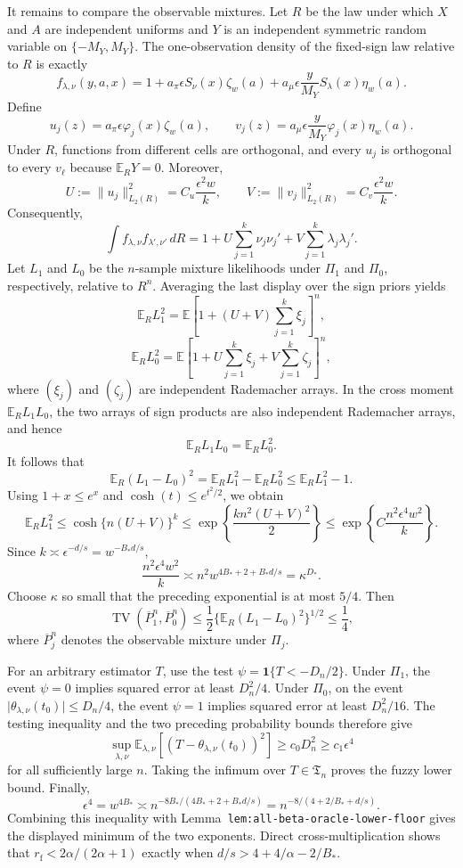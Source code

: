 It remains to compare the observable mixtures. Let \(R\) be the law under which \(X\) and \(A\) are independent uniforms and \(Y\) is an independent symmetric random variable on \(\{-M_Y,M_Y\}\). The one-observation density of the fixed-sign law relative to \(R\) is exactly
\[
f_{\lambda,\nu}(y,a,x)
=
1+a_\pi\epsilon S_\nu(x)\zeta_w(a)
+a_\mu\epsilon\frac{y}{M_Y}S_\lambda(x)\eta_w(a).
\]
Define
\[
u_j(z)=a_\pi\epsilon\varphi_j(x)\zeta_w(a),
\qquad
v_j(z)=a_\mu\epsilon\frac{y}{M_Y}\varphi_j(x)\eta_w(a).
\]
Under \(R\), functions from different cells are orthogonal, and every \(u_j\) is orthogonal to every \(v_\ell\) because \(\mathbb E_RY=0\). Moreover,
\[
U:=\lVert u_j\rVert_{L_2(R)}^2=C_u\frac{\epsilon^2w}{k},
\qquad
V:=\lVert v_j\rVert_{L_2(R)}^2=C_v\frac{\epsilon^2w}{k}.
\]
Consequently,
\[
\int f_{\lambda,\nu}f_{\lambda',\nu'}\,dR
=
1+U\sum_{j=1}^k\nu_j\nu_j'
+V\sum_{j=1}^k\lambda_j\lambda_j'.
\]
Let \(L_1\) and \(L_0\) be the \(n\)-sample mixture likelihoods under \(\Pi_1\) and \(\Pi_0\), respectively, relative to \(R^n\). Averaging the last display over the sign priors yields
\[
\mathbb E_RL_1^2
=
\mathbb E\left[1+(U+V)\sum_{j=1}^k\xi_j\right]^n,
\]
\[
\mathbb E_RL_0^2
=
\mathbb E\left[1+U\sum_{j=1}^k\xi_j+V\sum_{j=1}^k\zeta_j\right]^n,
\]
where \((\xi_j)\) and \((\zeta_j)\) are independent Rademacher arrays. In the cross moment \(\mathbb E_RL_1L_0\), the two arrays of sign products are also independent Rademacher arrays, and hence
\[
\mathbb E_RL_1L_0=\mathbb E_RL_0^2.
\]
It follows that
\[
\mathbb E_R(L_1-L_0)^2
=
\mathbb E_RL_1^2-\mathbb E_RL_0^2
\le
\mathbb E_RL_1^2-1.
\]
Using \(1+x\le e^x\) and \(\cosh(t)\le e^{t^2/2}\), we obtain
\[
\mathbb E_RL_1^2
\le
\cosh\{n(U+V)\}^k
\le
\exp\left\{\frac{k n^2(U+V)^2}{2}\right\}
\le
\exp\left\{C\frac{n^2\epsilon^4w^2}{k}\right\}.
\]
Since \(k\asymp\epsilon^{-d/s}=w^{-B_*d/s}\),
\[
\frac{n^2\epsilon^4w^2}{k}
\asymp
n^2w^{4B_*+2+B_*d/s}
=
\kappa^{D_*}.
\]
Choose \(\kappa\) so small that the preceding exponential is at most \(5/4\). Then
\[
\operatorname{TV}(\overline P_1^n,\overline P_0^n)
\le
\frac12\{\mathbb E_R(L_1-L_0)^2\}^{1/2}
\le\frac14,
\]
where \(\overline P_j^n\) denotes the observable mixture under \(\Pi_j\).

For an arbitrary estimator \(T\), use the test \(\psi=\mathbf 1\{T<-D_n/2\}\). Under \(\Pi_1\), the event \(\psi=0\) implies squared error at least \(D_n^2/4\). Under \(\Pi_0\), on the event \(\lvert\theta_{\lambda,\nu}(t_0)\rvert\le D_n/4\), the event \(\psi=1\) implies squared error at least \(D_n^2/16\). The testing inequality and the two preceding probability bounds therefore give
\[
\sup_{\lambda,\nu}
\mathbb E_{\lambda,\nu}[(T-\theta_{\lambda,\nu}(t_0))^2]
\ge c_0D_n^2
\ge c_1\epsilon^4
\]
for all sufficiently large \(n\). Taking the infimum over \(T\in\mathfrak T_n\) proves the fuzzy lower bound. Finally,
\[
\epsilon^4=w^{4B_*}
\asymp
n^{-8B_*/(4B_*+2+B_*d/s)}
=
n^{-8/(4+2/B_*+d/s)}.
\]
Combining this inequality with Lemma~\texttt{lem:all-beta-oracle-lower-floor} gives the displayed minimum of the two exponents. Direct cross-multiplication shows that \(r_{\mathrm f}<2\alpha/(2\alpha+1)\) exactly when \(d/s>4+4/\alpha-2/B_*\).